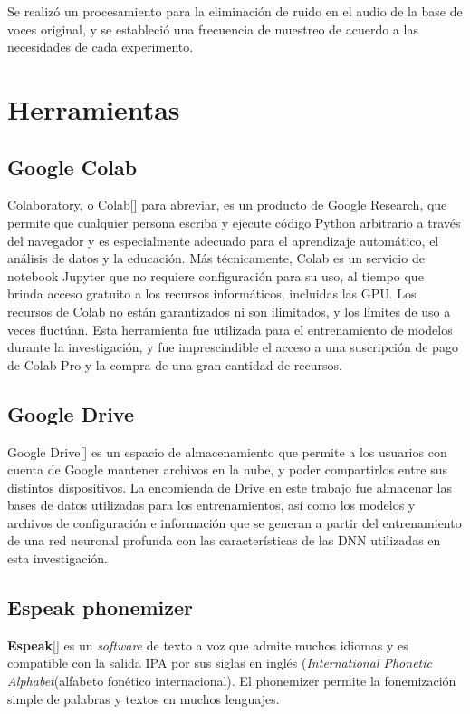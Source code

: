 Se realizó un procesamiento para la eliminación de ruido en el audio de la base de voces original, y se estableció una frecuencia de muestreo de acuerdo a las necesidades de cada experimento. 

\section{Herramientas}
\subsection{Google Colab}
Colaboratory, o Colab[\cite{colab}] para abreviar, es un producto de Google Research, que permite que cualquier persona escriba y ejecute código Python arbitrario a través del navegador y es especialmente adecuado para el aprendizaje automático, el análisis de datos y la educación. Más técnicamente, Colab es un servicio de notebook Jupyter que no requiere configuración para su uso, al tiempo que brinda acceso gratuito a los recursos informáticos, incluidas las GPU. Los recursos de Colab no están garantizados ni son ilimitados, y los límites de uso a veces fluctúan. Esta herramienta fue utilizada para el entrenamiento de modelos durante la investigación, y fue imprescindible el acceso a una suscripción de pago de Colab Pro y la compra de una gran cantidad de recursos. 

\subsection{Google Drive}
Google Drive[\cite{drive}] es un espacio de almacenamiento que permite a los usuarios con cuenta de Google mantener archivos en la nube, y poder compartirlos entre sus distintos dispositivos. La encomienda de Drive en este trabajo fue almacenar las bases de datos utilizadas para los entrenamientos, así como los modelos y archivos de configuración e información que se generan a partir del entrenamiento de una red neuronal profunda con las características de las DNN utilizadas en esta investigación.

\subsection{Espeak phonemizer}
\textbf{Espeak}[\cite{espeak}] es un \textit{software} de texto a voz que admite muchos idiomas y  es compatible con la salida IPA por sus siglas en inglés (\textit{International Phonetic Alphabet}(alfabeto fonético internacional).
El phonemizer permite la fonemización simple de palabras y textos en muchos lenguajes.

